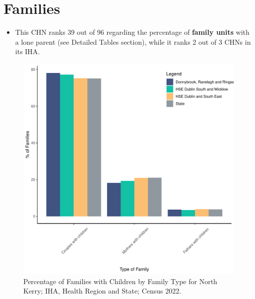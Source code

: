 \documentclass{article}
\begin{document}
\section{Families}\label{sect:Fam}
\begin{itemize}
\item This CHN ranks  39 out of 96 regarding the percentage of \textbf{family units} with a lone parent (see Detailed Tables section), while it ranks   2 out of 3 CHNs in its IHA.
\end{itemize}
\begin{figure}[H]
	\centering
	\includegraphics[width = 150mm]{../figures/FamED.pdf}
	\caption{Percentage of Families with Children by Family Type for North Kerry; IHA, Health Region and State; Census 2022.}
	\label{fig:vbnv}
	\end{figure}
	
\end{document}
